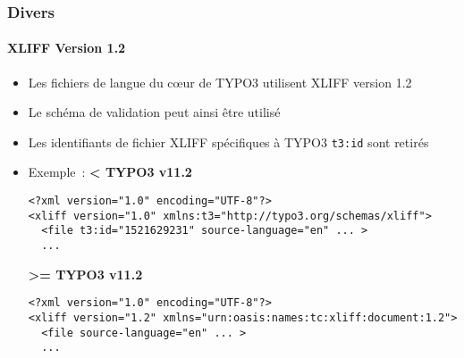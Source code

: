 %

\begin{frame}[fragile]
	\frametitle{Divers}
	\framesubtitle{XLIFF Version 1.2}


	\begin{itemize}
		\item Les fichiers de langue du cœur de TYPO3 utilisent XLIFF version 1.2
		\item Le schéma de validation peut ainsi être utilisé
		\item Les identifiants de fichier XLIFF spécifiques à TYPO3 \texttt{t3:id} sont retirés
		\item Exemple~:\newline
\smaller\textbf{< TYPO3 v11.2}\normalsize
\begin{lstlisting}
<?xml version="1.0" encoding="UTF-8"?>
<xliff version="1.0" xmlns:t3="http://typo3.org/schemas/xliff">
  <file t3:id="1521629231" source-language="en" ... >
  ...
\end{lstlisting}
\smaller\textbf{>= TYPO3 v11.2}\normalsize
\begin{lstlisting}
<?xml version="1.0" encoding="UTF-8"?>
<xliff version="1.2" xmlns="urn:oasis:names:tc:xliff:document:1.2">
  <file source-language="en" ... >
  ...
\end{lstlisting}

	\end{itemize}

\end{frame}

